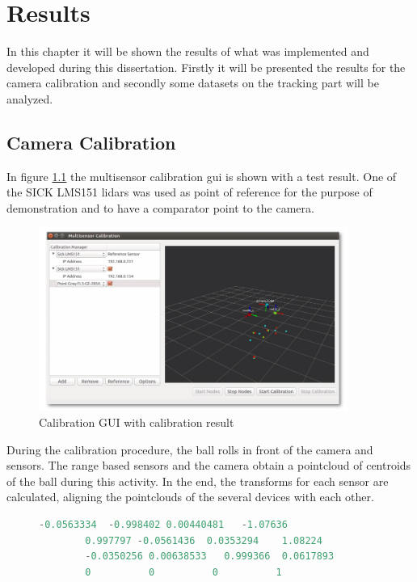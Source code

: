 \chapter{Results}

In this chapter it will be shown the results of what was implemented and developed during this dissertation. Firstly it will be presented the results for the camera calibration and secondly some datasets on the tracking part will be analyzed.

\section{Camera Calibration}

In figure \ref{fig:gui} the multisensor calibration \gls{gui} is shown with a test result. One of the SICK LMS151 \gls{lidar}s was used as point of reference for the purpose of demonstration and to have a comparator point to the camera.
\begin{figure}[htp]
	
	\centering
	\includegraphics[width=0.9\textwidth]{capresults/imgs/gui.png}
	
	\caption{Calibration GUI with calibration result}
	\label{fig:gui}
	
\end{figure}

During the calibration procedure, the ball rolls in front of the camera and sensors. The range based sensors and the camera obtain a pointcloud of centroids of the ball during this activity. In the end, the transforms for each sensor are calculated, aligning the pointclouds of the several devices with each other. 

\begin{figure}
	\begin{center}
		\begin{lstlisting}[label={lst:calib_result}, caption={Calibration output file.},language=c++]
		-0.0563334  -0.998402 0.00440481   -1.07636
		0.997797 -0.0561436  0.0353294    1.08224
		-0.0350256 0.00638533   0.999366  0.0617893
		0          0          0          1	\end{lstlisting}
	\end{center}
\end{figure}

